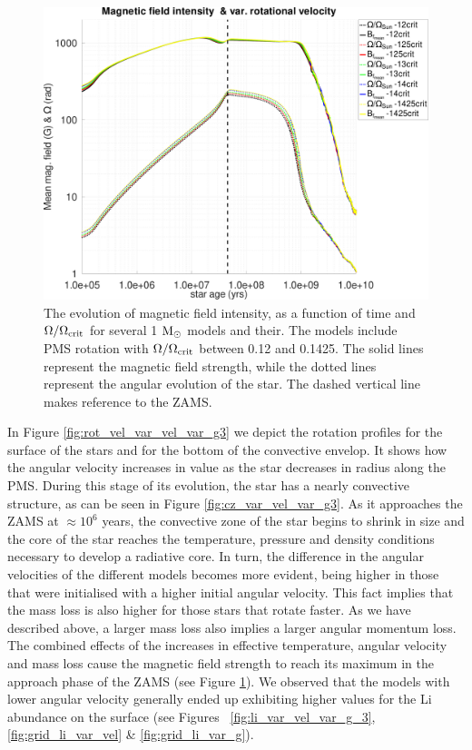 \documentclass[fleqn,usenatbib]{mnras}
\begin{document}
\begin{ceqn}
\begin{figure}
	\includegraphics[clip,width=\columnwidth]{figures/paper2/mag_field_var_vel_g3.pdf}
    \caption{The evolution of magnetic field intensity, as a function of time and $\Omega / \Omega_{\mathrm{crit}}$ for several 1 $\mathrm{M}_\odot$ models and their. The models include PMS rotation with $\Omega / \Omega_{\mathrm{crit}}$ between 0.12 and 0.1425. The solid lines represent the magnetic field strength, while the dotted lines represent the angular evolution of the star. The dashed vertical line makes reference to the ZAMS.}
    \label{fig:mag_field_var_vel_g3}
\end{figure}


In Figure \ref{fig:rot_vel_var_vel_var_g3} we depict the rotation profiles for the surface of the stars and for the bottom of the convective envelop. It shows how the angular velocity increases in value as the star decreases in radius along the PMS. During this stage of its evolution, the star has a nearly convective structure, as can be seen in Figure \ref{fig:cz_var_vel_var_g3}. As it approaches the ZAMS at $\approx 10^6$ years, the convective zone of the star begins to shrink in size and the core of the star reaches the temperature, pressure and density conditions necessary to develop a radiative core. In turn, the difference in the angular velocities of the different models becomes more evident, being higher in those that were initialised with a higher initial angular velocity. This fact implies that the mass loss is also higher for those stars that rotate faster. As we have described above, a larger mass loss also implies a larger angular momentum loss. The combined effects of the increases in effective temperature, angular velocity and mass loss cause the magnetic field strength to reach its maximum in the approach phase of the ZAMS (see Figure \ref{fig:mag_field_var_vel_g3}). We observed that the models with lower angular velocity generally ended up exhibiting higher values for the Li abundance on the surface (see Figures~ \ref{fig:li_var_vel_var_g_3}, \ref{fig:grid_li_var_vel} \& \ref{fig:grid_li_var_g}).\par


\end{ceqn}
\end{document}

